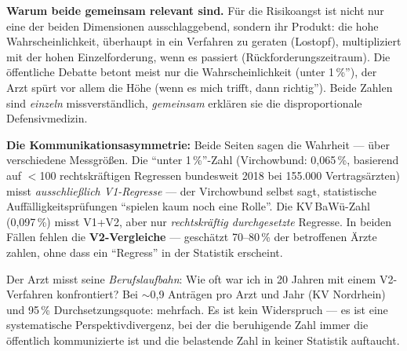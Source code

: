 \documentclass{umbruch-position}
\begin{document}
\noindent\textbf{Warum beide gemeinsam relevant sind.} F\"ur die Risikoangst ist nicht nur eine der beiden Dimensionen ausschlaggebend, sondern ihr Produkt: die hohe Wahrscheinlichkeit, \"uberhaupt in ein Verfahren zu geraten (Lostopf), multipliziert mit der hohen Einzel\-forderung, wenn es passiert (R\"uckforderungs\-zeitraum). Die \"offentliche Debatte betont meist nur die Wahrscheinlichkeit (\glqq{}unter 1\,\%''), der Arzt sp\"urt vor allem die H\"ohe (\glqq{}wenn es mich trifft, dann richtig''). Beide Zahlen sind \textit{einzeln} missverst\"andlich, \textit{gemeinsam} erkl\"aren sie die disproportionale Defensivmedizin.

\textbf{Die Kommunikationsasymmetrie:} Beide Seiten sagen die Wahrheit --- über verschiedene Messgrößen. Die ``unter 1\,\%''-Zahl (Virchowbund: 0,065\,\%, basierend auf $<$100 rechtskräftigen Regressen bundesweit 2018 bei 155.000 Vertragsärzten) misst \textit{ausschließlich V1-Regresse} --- der Virchowbund selbst sagt, statistische Auffälligkeitsprüfungen ``spielen kaum noch eine Rolle''. Die KV\,BaWü-Zahl (0,097\,\%) misst V1+V2, aber nur \textit{rechtskräftig durchgesetzte} Regresse. In beiden Fällen fehlen die \textbf{V2-Vergleiche} --- geschätzt 70--80\,\% der betroffenen Ärzte zahlen, ohne dass ein ``Regress'' in der Statistik erscheint.

Der Arzt misst seine \textit{Berufslaufbahn}: Wie oft war ich in 20 Jahren mit einem V2-Verfahren konfrontiert? Bei $\sim$0,9 Anträgen pro Arzt und Jahr (KV Nordrhein) und 95\,\% Durchsetzungsquote: mehrfach. Es ist kein Widerspruch --- es ist eine systematische Perspektivdivergenz, bei der die beruhigende Zahl immer die öffentlich kommunizierte ist und die belastende Zahl in keiner Statistik auftaucht.
\end{document}
